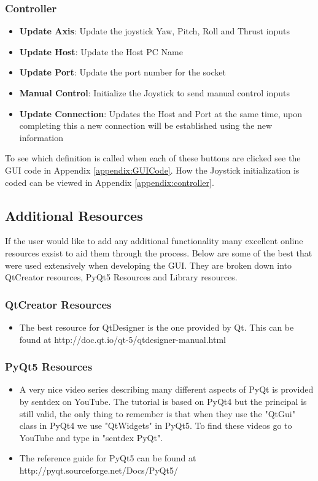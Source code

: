 \subsubsection{Controller}
\begin{itemize}
	\item \textbf{Update Axis}: Update the joystick Yaw, Pitch, Roll and Thrust inputs
	\item \textbf{Update Host}: Update the Host PC Name
	\item \textbf{Update Port}: Update the port number for the socket
	\item \textbf{Manual Control}: Initialize the Joystick to send manual control inputs
	\item \textbf{Update Connection}: Updates the Host and Port at the same time, upon completing this a new connection will be established using the new information
\end{itemize}
To see which definition is called when each of these buttons are clicked see the GUI code in Appendix \ref{appendix:GUICode}. How the Joystick initialization is coded can be viewed in Appendix \ref{appendix:controller}.
\subsection{Additional Resources}
If the user would like to add any additional functionality many excellent online resources exsist to aid them through the process. Below are some of the best that were used extensively when developing the GUI. They are broken down into QtCreator resources, PyQt5 Resources and Library resources. 

\subsubsection{QtCreator Resources}
\begin{itemize}
	\item The best resource for QtDesigner is the one provided by Qt. This can be found at http://doc.qt.io/qt-5/qtdesigner-manual.html
\end{itemize}
\subsubsection{PyQt5 Resources}
\begin{itemize}
	\item A very nice video series describing many different aspects of PyQt is provided by sentdex on YouTube. The tutorial is based on PyQt4 but the principal is still valid, the only thing to remember is that when they use the "QtGui" class in PyQt4 we use "QtWidgets" in PyQt5. To find these videos go to YouTube and type in "sentdex PyQt".
	\item The reference guide for PyQt5 can be found at http://pyqt.sourceforge.net/Docs/PyQt5/
\end{itemize}
